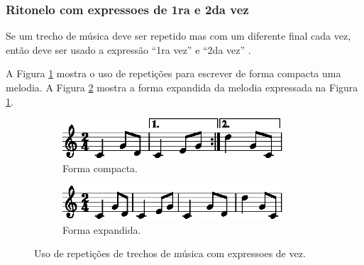 \subsubsection{Ritonelo com expressoes de 1ra e 2da vez}
Se um trecho de música deve ser repetido mas com um diferente final cada vez,
então deve ser usado a expressão ``1ra vez'' e ``2da vez''
\cite[pp. 239]{medteoria} \cite[pp. 169]{cardoso1973curso}.

A Figura \ref{fig:ritonelo-times1-1} mostra o uso de repetições para escrever de forma compacta uma melodia.
A Figura \ref{fig:ritonelo-times2-1} mostra a forma expandida da melodia expressada na Figura \ref{fig:ritonelo-times1-1}.
\begin{figure}[!h]
\centering
    \begin{subfigure}[b]{0.75\textwidth}
        \includegraphics[width=0.9\textwidth]{chapters/cap-musica-basica/ritonelo-times1-1.eps}
        \caption{Forma compacta.}
        \label{fig:ritonelo-times1-1}
    \end{subfigure}
    \begin{subfigure}[b]{0.75\textwidth}
        \includegraphics[width=0.9\textwidth]{chapters/cap-musica-basica/ritonelo-times2-1.eps}
        \caption{Forma expandida.}
        \label{fig:ritonelo-times2-1}
    \end{subfigure}
\caption{Uso de repetições de trechos de música com expressoes de vez.}
\label{fig:ritonelo-times1}
\end{figure}

